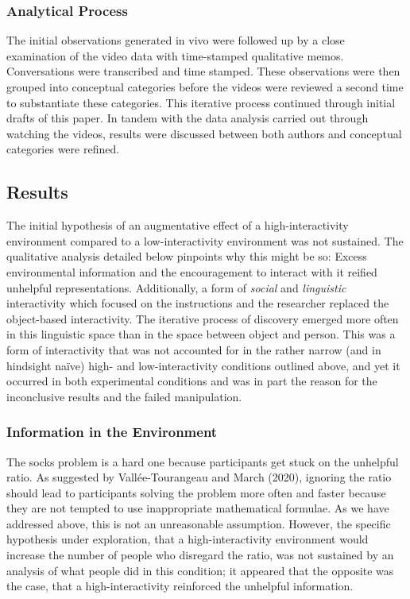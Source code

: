 \documentclass{article}
\begin{document}
\subsubsection{Analytical Process}

The initial observations generated in vivo were followed up by a close examination of the video data with time-stamped qualitative memos. Conversations were transcribed and time stamped. These observations were then grouped into conceptual categories before the videos were reviewed a second time to substantiate these categories. This iterative process continued through initial drafts of this paper. In tandem with the data analysis carried out through watching the videos, results were discussed between both authors and conceptual categories were refined. 

\subsection{Results}

The initial hypothesis of an augmentative effect of a high-interactivity environment compared to a low-interactivity environment was not sustained. The qualitative analysis detailed below pinpoints why this might be so: Excess environmental information and the encouragement to interact with it reified unhelpful representations. Additionally, a form of \emph{social} and \emph{linguistic} interactivity which focused on the instructions and the researcher replaced the object-based interactivity. The iterative process of discovery emerged more often in this linguistic space than in the space between object and person. This was a form of interactivity that was not accounted for in the rather narrow (and in hindsight naïve) high- and low-interactivity conditions outlined above, and yet it occurred in both experimental conditions and was in part the reason for the inconclusive results and the failed manipulation. 

\subsubsection{Information in the Environment}

The socks problem is a hard one because participants get stuck on the unhelpful ratio. As suggested by Vallée-Tourangeau and March (2020), ignoring the ratio should lead to participants solving the problem more often and faster because they are not tempted to use inappropriate mathematical formulae. As we have addressed above, this is not an unreasonable assumption. However, the specific hypothesis under exploration, that a high-interactivity environment would increase the number of people who disregard the ratio, was not sustained by an analysis of what people did in this condition; it appeared that the opposite was the case, that a high-interactivity reinforced the unhelpful information. 
\end{document}
